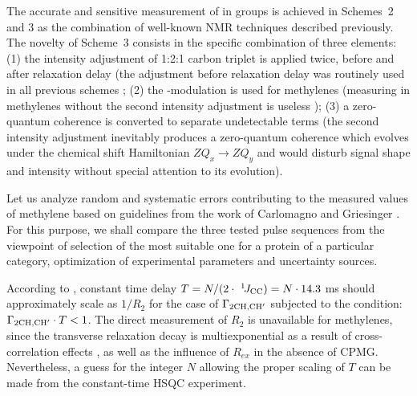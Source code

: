\documentclass[twocolumn]{svjour3}           %
\begin{document}
The accurate and sensitive measurement of \gtwoCH{} in \CHtwo{} groups
is achieved in Schemes~2 and 3 as the combination of well-known NMR
techniques described previously. The novelty of Scheme~3 consists in the specific
combination of three elements: (1) the intensity adjustment of 1:2:1 carbon triplet is
applied twice, before and after relaxation delay 
(the adjustment before relaxation delay was routinely used in all previous schemes
\cite{banci_side_2001,zheng_measurement_2004,yang_study_1998}; 
(2) the \oneJch-modulation is used for methylenes
(measuring \gtwoCH{} in methylenes 
without the second intensity adjustment is useless \cite{yang_probing_2011});
(3) a zero-quantum coherence is converted to separate undetectable terms (the second intensity adjustment inevitably produces a zero-quantum 
coherence which evolves under the chemical shift Hamiltonian 
$ZQ_x\xrightarrow{} ZQ_y$ and would disturb signal shape and intensity without special attention to its evolution).

Let us analyze random and systematic errors contributing to the measured
values of methylene \gtwoCH{} based on guidelines 
from the work of Carlomagno and Griesinger \cite{carlomagno_errors_2000}. 
For this purpose, we shall compare the three 
tested pulse sequences from the viewpoint of selection of the most 
suitable one for a protein of a particular category, optimization of
experimental parameters and uncertainty sources.

According to \cite{carlomagno_errors_2000}, constant time delay 
$T = \allowbreak N/\allowbreak (2\cdot~^1\!J_{\text{CC}}) \allowbreak = N\cdot 14.3$ ms should approximately scale as 
$1/R_2$ for the case of  $\Gamma_{\text{2CH,CH}'}$ subjected to the condition: 
$\Gamma_{\text{2CH,CH}'}\cdot T < 1$. The direct measurement of $R_2$ is unavailable 
for methylenes, since the \clab{} transverse relaxation decay is 
multiexponential as a result of cross-correlation
effects \cite{yang_probing_2011}, as well as the influence of $R_{ex}$ in the absence of {CPMG}. Nevertheless, a guess for the integer  $N$ allowing the proper scaling of $T$ can be made from the constant-time \clab{} {HSQC} experiment.
\end{document}
